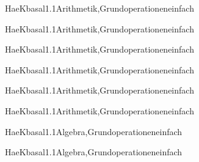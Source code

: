 \documentclass[12pt]{article}
\begin{document}
\begin{Add}{HaeK}{basal1.1}{Arithmetik,Grundoperationen}{einfach}
\solution{ }
\end{Add}
\begin{Add}{HaeK}{basal1.1}{Arithmetik,Grundoperationen}{einfach}
\end{Add}

\begin{Add}{HaeK}{basal1.1}{Arithmetik,Grundoperationen}{einfach}
\solution{ }
\end{Add}
\begin{Add}{HaeK}{basal1.1}{Arithmetik,Grundoperationen}{einfach}
\end{Add}

\begin{Add}{HaeK}{basal1.1}{Arithmetik,Grundoperationen}{einfach}
\solution{ }
\end{Add}
\begin{Add}{HaeK}{basal1.1}{Arithmetik,Grundoperationen}{einfach}
\end{Add}

            \begin{Add}{HaeK}{basal1.1}{Algebra,Grundoperationen}{einfach}
            \solution{ }
            \end{Add}
            \begin{Add}{HaeK}{basal1.1}{Algebra,Grundoperationen}{einfach}
            \end{Add}
            
\end{document}
